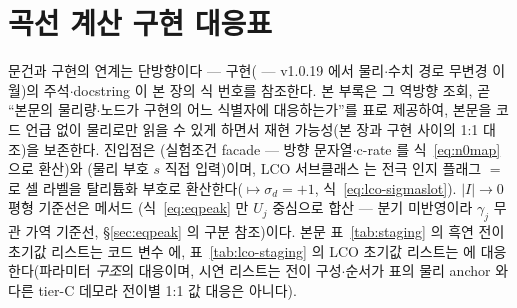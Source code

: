 \section{곡선 계산 구현 대응표}\label{sec:appendix-code}
문건과 구현의 연계는 단방향이다 --- 구현( --- v1.0.19 에서 물리$\cdot$수치
경로 무변경 이월)의 주석$\cdot$docstring 이 본 장의 식 번호를 참조한다. 본 부록은 그 역방향 조회, 곧 ``본문의 물리량$\cdot$노드가 구현의 어느 식별자에
대응하는가''를 표로 제공하여, 본문을 코드 언급 없이 물리로만 읽을 수 있게 하면서 재현 가능성(본 장과
구현 사이의 1:1 대조)을 보존한다. 진입점은 (실험조건 facade --- 방향 문자열$\cdot$c-rate 를
식~\eqref{eq:n0map} 으로 환산)와 (물리 부호 $s$ 직접 입력)이며, LCO 서브클래스
 는 전극 인지 플래그 $=$ 로 셀 라벨을
탈리튬화 부호로 환산한다($\mapsto\sigma_d{=}+1$, 식~\eqref{eq:lco-sigmaslot}). $|I|\to0$
평형 기준선은 메서드 (식~\eqref{eq:eqpeak} 만 $U_j$ 중심으로 합산 --- 분기
미반영이라 $\gamma_j$ 무관 가역 기준선, \S\ref{sec:eqpeak} 의 구분 참조)이다. 본문 표~\ref{tab:staging} 의
흑연 전이 초기값 리스트는 코드 변수  에, 표~\ref{tab:lco-staging} 의 LCO
초기값 리스트는  에 대응한다(파라미터 \emph{구조}의 대응이며, 
시연 리스트는 전이 구성$\cdot$순서가 표의 물리 anchor 와 다른 tier-C 데모라 전이별 1:1 값 대응은 아니다).

